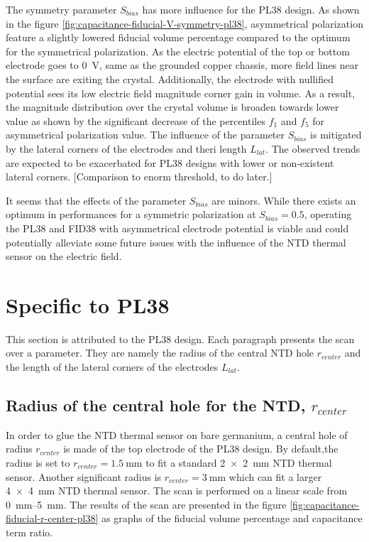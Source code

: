 The symmetry parameter $S_{bias}$ has more influence for the PL38 design. As shown in the figure \ref{fig:capacitance-fiducial-V-symmetry-pl38}, asymmetrical polarization feature a slightly lowered fiducial volume percentage compared to the optimum for the symmetrical polarization. As the electric potential of the top or bottom electrode goes to \SI{0}{\volt}, same as the grounded copper chassis, more field lines near the surface are exiting the crystal. Additionally, the electrode with nullified potential sees its low electric field magnitude corner gain in volume. As a result, the magnitude distribution over the crystal volume is broaden towards lower value as shown by the significant decrease of the percentiles $f_1$ and $f_5$ for asymmetrical polarization value.
The influence of the parameter $S_{bias}$ is mitigated by the lateral corners of the electrodes and theri length $L_{lat}$. The observed trends are expected to be exacerbated for PL38 designs with lower or non-existent lateral corners.
{\color{red} [Comparison to enorm threshold, to do later.]}

It seems that the effects of the parameter $S_{bias}$ are minors. While there exists an optimum in performances for a symmetric polarization at $S_{bias}=\num{0.5}$, operating the PL38 and FID38 with asymmetrical electrode potential is viable and could potentially alleviate some future issues with the influence of the NTD thermal sensor on the electric field. 


\section{Specific to PL38}

This section is attributed to the PL38 design. Each paragraph presents the scan over a parameter. They are namely the radius of the central NTD hole $r_{center}$ and the length of the lateral corners of the electrodes $L_{lat}$.


\subsection{Radius of the central hole for the NTD, $r_{center}$}

In order to glue the NTD thermal sensor on bare germanium, a central hole of radius $r_{center}$ is made of the top electrode of the PL38 design. By default,the radius is set to $r_{center} = \SI{1.5}{\mm}$ to fit a standard \SI{2 x 2}{\mm} NTD thermal sensor. Another significant radius is $r_{center}=\SI{3}{\mm}$ which can fit a larger \SI{4 x 4}{\mm} NTD thermal sensor. The scan is performed on a linear scale from \SIrange{0}{5}{\mm}. The results of the scan are presented in the figure \ref{fig:capacitance-fiducial-r-center-pl38} as graphs of the fiducial volume percentage and capacitance term ratio.


